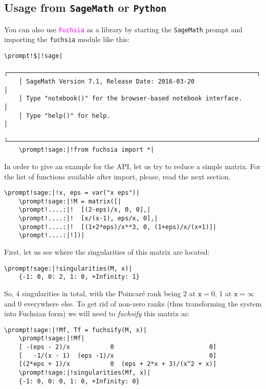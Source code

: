 \documentclass{elsarticle}
\newcommand{\fuchsia}{\textcolor{fuchsia}{\texttt{Fuchsia}}\xspace}
\newcommand{\python}{\texttt{Python}\xspace}
\newcommand{\sage}{\texttt{SageMath}\xspace}
\newcommand{\code}[1]{\texttt{#1}}
\newcommand{\prompt}[2]{\textcolor{prompt}{#1} \textcolor{command}{#2}}
\begin{document}
\subsection{Usage from \sage or \python}
\label{sec:usage_py}

You can also use \fuchsia as a library by starting the \sage prompt and importing the \texttt{fuchsia} module like this:

\begin{Verbatim}[commandchars=\\!|]
    \prompt!$|!sage|
    ┌────────────────────────────────────────────────────────────────────┐
    │ SageMath Version 7.1, Release Date: 2016-03-20                     │
    │ Type "notebook()" for the browser-based notebook interface.        │
    │ Type "help()" for help.                                            │
    └────────────────────────────────────────────────────────────────────┘
    \prompt!sage:|!from fuchsia import *|
\end{Verbatim}

In order to give an example for the API, let us try to reduce a simple matrix.
For the list of functions available after import, please, read the next section.

\begin{Verbatim}[commandchars=\\!|]
    \prompt!sage:|!x, eps = var("x eps")|
    \prompt!sage:|!M = matrix([|
    \prompt!....:|!  [(2-eps)/x, 0, 0],|
    \prompt!....:|!  [x/(x-1), eps/x, 0],|
    \prompt!....:|!  [(1+2*eps)/x**3, 0, (1+eps)/x/(x+1)]|
    \prompt!....:|!])|
\end{Verbatim}

First, let us see where the singularities of this matrix are located:

\begin{Verbatim}[commandchars=\\!|]
    \prompt!sage:|!singularities(M, x)|
    {-1: 0, 0: 2, 1: 0, +Infinity: 1}
\end{Verbatim}

So, 4 singularities in total, with the Poincar\'e rank being 2 at $\code{x}=0$, 1 at $\code{x}=\infty$ and 0 everywhere else.
To get rid of non-zero ranks (thus transforming the system into Fuchsian form) we will need to \textit{fuchsify} this matrix as:

\begin{Verbatim}[commandchars=\\!|]
    \prompt!sage:|!Mf, Tf = fuchsify(M, x)|
    \prompt!sage:|!Mf|
    [ -(eps - 2)/x           0                          0]
    [   -1/(x - 1)  (eps -1)/x                          0]
    [(2*eps + 1)/x           0  (eps + 2*x + 3)/(x^2 + x)]
    \prompt!sage:|!singularities(Mf, x)|
    {-1: 0, 0: 0, 1: 0, +Infinity: 0}
\end{Verbatim}
\end{document}
